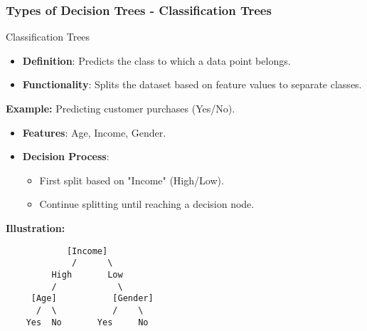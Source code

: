 \documentclass[aspectratio=169]{beamer}
\begin{document}
\begin{frame}[fragile]
    \frametitle{Types of Decision Trees - Classification Trees}
    \begin{block}{Classification Trees}
        \begin{itemize}
            \item \textbf{Definition}: Predicts the class to which a data point belongs.
            \item \textbf{Functionality}: Splits the dataset based on feature values to separate classes.
        \end{itemize}
    \end{block}
    
    \textbf{Example:} Predicting customer purchases (Yes/No).
    \begin{itemize}
        \item \textbf{Features}: Age, Income, Gender.
        \item \textbf{Decision Process}:
        \begin{itemize}
            \item First split based on "Income" (High/Low).
            \item Continue splitting until reaching a decision node.
        \end{itemize}
    \end{itemize}
    
    \textbf{Illustration:}
    \begin{verbatim}
            [Income]
             /      \
         High       Low
         /            \
     [Age]           [Gender]
      /  \           /    \
    Yes  No       Yes     No
    \end{verbatim}
\end{frame}
\end{document}
